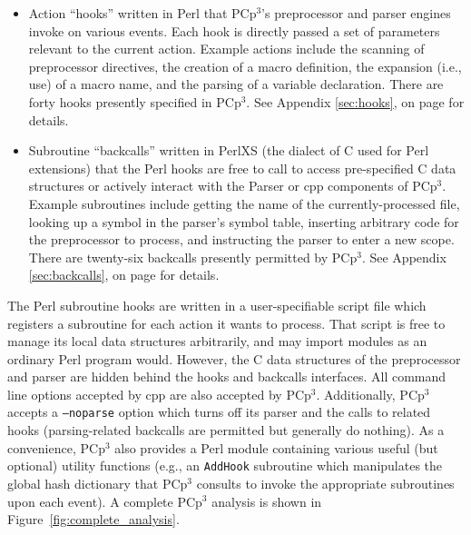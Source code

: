 \documentclass{article}
\newcommand{\pcp}{\mbox{\textsf{PCp}$^3$}}
\newcommand{\Cpp}{\mbox{\textsf{cpp}}}
\newcommand{\Perl}{\mbox{Perl}}
\newcommand{\C}{\mbox{C}}
\newcommand{\appendixref}[1]{Appendix \ref{#1}, on page \pageref{#1}}
\newcommand{\ie}{i.e.,}
\newcommand{\eg}{e.g.,}
\newcommand{\figref}[1]{Figure~\ref{#1}}
\begin{document}
\begin{itemize}
\item Action ``hooks'' written in \Perl{} that \pcp{}'s preprocessor and
      parser engines invoke on various events. Each hook is directly
      passed a set of parameters relevant to the current action.
      Example actions include the scanning of preprocessor directives,
      the creation of a macro definition, the expansion (\ie{} use) of a
      macro name, and the parsing of a variable declaration.  There are
      forty hooks presently specified in \pcp{}. See
      \appendixref{sec:hooks} for details.
\item Subroutine ``backcalls'' written in {PerlXS} (the dialect of \C{}
      used for \Perl{} extensions) that the \Perl{} hooks are free to
      call to access pre-specified \C{} data structures or actively
      interact with the Parser or \Cpp{} components of \pcp{}.  Example
      subroutines include getting the name of the currently-processed
      file, looking up a symbol in the parser's symbol table, inserting
      arbitrary code for the preprocessor to process, and instructing the
      parser to enter a new scope.  There are twenty-six backcalls
      presently permitted by \pcp{}.  See \appendixref{sec:backcalls}
      for details.
\end{itemize}

\noindent The \Perl{} subroutine hooks are written in a user-specifiable script
file which registers a subroutine for each action it wants to process.
That script is free to manage its local data structures arbitrarily, and
may import modules as an ordinary \Perl{} program would.  However, the
\C{} data structures of the preprocessor and parser are hidden behind the hooks and backcalls
interfaces. All command line options accepted by \Cpp{} are also
accepted by \pcp{}.  Additionally, \pcp{} accepts a \texttt{--noparse}
option which turns off its parser and the calls to related hooks
(parsing-related backcalls are permitted but generally do nothing).  As
a convenience, \pcp{} also provides a \Perl{} module containing various
useful (but optional) utility functions (\eg{} an \texttt{AddHook}
subroutine which manipulates the global hash dictionary
that \pcp{} consults to invoke the appropriate subroutines upon each
event). A complete \pcp{} analysis is shown in
\figref{fig:complete_analysis}.
\end{document}
